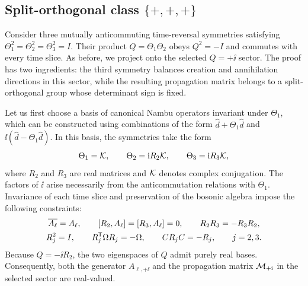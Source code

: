 \subsection{Split-orthogonal class \texorpdfstring{\(\{+,+,+\}\)}{\{+,+,+\}}}

Consider three mutually anticommuting time-reversal symmetries satisfying $\Theta_1^2=\Theta_2^2=\Theta_3^2=I$. Their product $Q=\Theta_1\Theta_2$ obeys $Q^2=-I$ and commutes with every time slice. As before, we project onto the selected $Q=+\ii$ sector. The proof has two ingredients: the third symmetry balances creation and annihilation directions in this sector, while the resulting propagation matrix belongs to a split-orthogonal group whose determinant sign is fixed.

Let us first choose a basis of canonical Nambu operators invariant under $\Theta_1$, which can be constructed using combinations of the form $\hat d+\Theta_1\hat d$ and $\ii(\hat d-\Theta_1\hat d)$. In this basis, the symmetries take the form
\begin{equation}
    \Theta_1=\mathcal{K},\qquad \Theta_2=\mathrm{i} R_2\mathcal{K},\qquad
    \Theta_3=\mathrm{i} R_3\mathcal{K},
    \label{eq:trs_three_plus_basis}
\end{equation}
where $R_2$ and $R_3$ are real matrices and $\mathcal{K}$ denotes complex conjugation. The factors of $\ii$ arise necessarily from the anticommutation relations with $\Theta_1$. Invariance of each time slice and preservation of the bosonic algebra impose the following constraints:
\begin{gather}
    \overline{A_\ell}=A_\ell,\qquad [R_2,A_\ell]=[R_3,A_\ell]=0,
    \qquad R_2R_3=-R_3R_2,\notag\\
    R_j^2=I,\qquad R_j^{\mathsf{T}}\Omega R_j=-\Omega,\qquad
    CR_jC=-R_j,\qquad j=2,3.
    \label{eq:trs_three_plus_physical}
\end{gather}
Because $Q=-\ii R_2$, the two eigenspaces of $Q$ admit purely real bases. Consequently, both the generator $A_{\ell,+\ii}$ and the propagation matrix $\mathcal{M}_{+\mathrm{i}}$ in the selected sector are real-valued.

